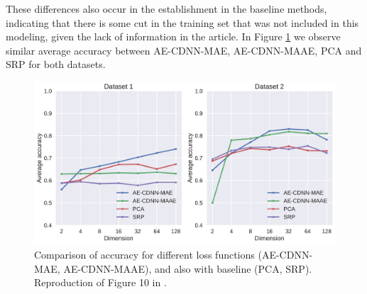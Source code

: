 These differences also occur in the establishment in the baseline methods, indicating that there is some cut in the training set that was not included in this modeling, given the lack of information in the article. In Figure \ref{fig:baseline_methods} we observe similar average accuracy between AE-CDNN-MAE, AE-CDNN-MAAE, PCA and SRP for both datasets. 


\begin{figure}[!ht]
\centering
\includegraphics[width=\linewidth]{figure/baseline_methods.pdf}
  \caption{Comparison of accuracy for different loss functions (AE-CDNN-MAE, AE-CDNN-MAAE), and also with baseline (PCA, SRP). Reproduction of Figure 10 in \cite{WenZha:2018}.}
\label{fig:baseline_methods}
\end{figure}

